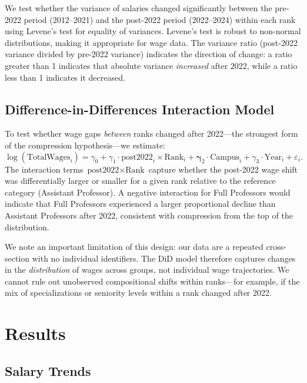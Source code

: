 \documentclass[12pt]{article}
\begin{document}
We test whether the variance of salaries changed significantly between
the pre-2022 period (2012--2021) and the post-2022 period (2022--2024)
within each rank using Levene's test for equality of variances.
Levene's test is robust to non-normal distributions, making it
appropriate for wage data. The variance ratio (post-2022 variance divided
by pre-2022 variance) indicates the direction of change: a ratio greater
than 1 indicates that absolute variance \emph{increased} after 2022,
while a ratio less than 1 indicates it decreased.

\subsection{Difference-in-Differences Interaction Model}

To test whether wage gaps \emph{between} ranks changed after 2022---the
strongest form of the compression hypothesis---we estimate:
\begin{equation}
  \log(\text{TotalWages}_{i}) =
    \gamma_0 + \gamma_1 \cdot \text{post2022}_{i}
    \times \text{Rank}_i
    + \mathbf{\gamma}_2 \cdot \text{Campus}_i
    + \gamma_3 \cdot \text{Year}_i + \varepsilon_i.
  \label{eq:did}
\end{equation}
The interaction terms $\text{post2022} \times \text{Rank}$ capture
whether the post-2022 wage shift was differentially larger or smaller
for a given rank relative to the reference category (Assistant
Professor). A negative interaction for Full Professors would indicate
that Full Professors experienced a larger proportional decline than
Assistant Professors after 2022, consistent with compression from the
top of the distribution.

We note an important limitation of this design: our data are a repeated
cross-section with no individual identifiers. The DiD model therefore
captures changes in the \emph{distribution} of wages across groups, not
individual wage trajectories. We cannot rule out unobserved compositional
shifts within ranks---for example, if the mix of specializations or
seniority levels within a rank changed after 2022.

\section{Results}
\label{sec:results}

\subsection{Salary Trends}
\label{subsec:trends}
\end{document}
